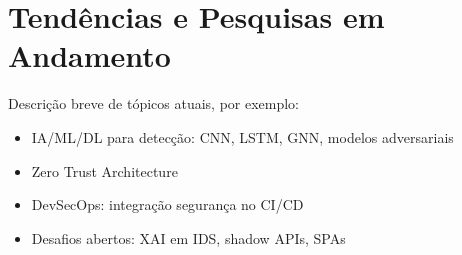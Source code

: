 {
\color{olive}

\section{
    Tendências e Pesquisas em Andamento
} \label{sec:ongoing_research}

Descrição breve de tópicos atuais, por exemplo:

\begin{itemize}
    \item  IA/ML/DL para detecção: CNN, LSTM, GNN, modelos adversariais
    \item Zero Trust Architecture
    \item DevSecOps: integração segurança no CI/CD
    \item Desafios abertos: XAI em IDS, shadow APIs, SPAs
\end{itemize}

\lipsum[20-25]
}